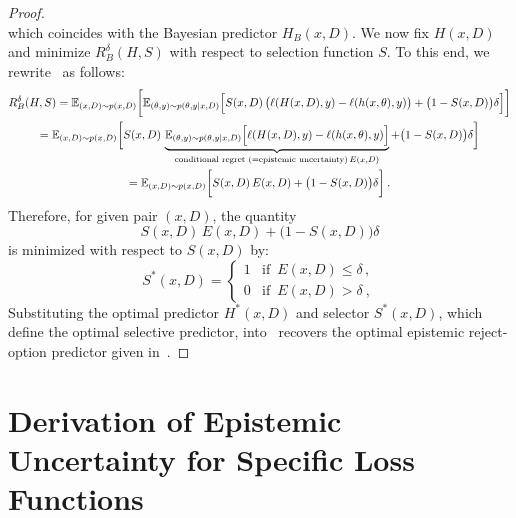 \begin{proof}
\begin{equation}
\end{equation}
%
which coincides with the Bayesian predictor $H_B(x,D)$.
%
We now fix $H(x,D)$ and minimize $R^\delta_B(H,S)$ with respect to selection function $S$. To this end, we rewrite~ as follows:
\begin{multline}
R^\delta_B(H,S)  =  {\mathbb{E}}_{(x,D)\sim p(x,D)} \bigg [ 
{\mathbb{E}}_{(\theta,y)\sim p(\theta,y|x,D)} \Big[ 
S(x,D)\,\big(\ell(H(x,D),y)-\ell(h(x,\theta),y)\big) + \big(1-S(x,D)\big ) \delta \Big] \bigg]\\
 =  {\mathbb{E}}_{(x,D)\sim p(x,D)} \bigg [ S(x,D)\,
\underbrace{{\mathbb{E}}_{(\theta,y)\sim p(\theta,y|x,D)} \Big[ 
\ell(H(x,D),y)-\ell(h(x,\theta),y)\Big]}_{\text{conditional regret  (=epistemic uncertainty)}\,E(x,D)} + \big(1-S(x,D)\big ) \delta  \bigg]\\
=  {\mathbb{E}}_{(x,D)\sim p(x,D)} \bigg [ S(x,D)\, E(x,D) + \big(1-S(x,D)\big ) \delta  \bigg] \:.\\
\end{multline}
%
Therefore, for given pair $(x,D)$, the quantity $$S(x,D)\, E(x,D) + \big(1-S(x,D)\big ) \delta$$ 
is minimized with respect to $S(x,D)$ by:
\begin{equation}
\label{equ:OptS}
  S^*(x,D) = \begin{cases}
       1 & \text{if }\, E(x,D) \leq \delta\,,\\
       0 & \text{if }\, E(x,D) > \delta \:,
   \end{cases}    
\end{equation}
%
Substituting the optimal predictor $H^*(x,D)$ and selector $S^*(x,D)$, which define the optimal selective predictor, into~ recovers the optimal epistemic reject-option predictor given in~.
\end{proof}




\section*{Derivation of Epistemic Uncertainty for Specific Loss Functions}


